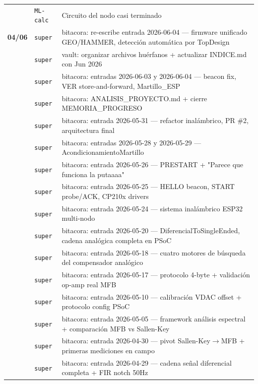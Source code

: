 \begin{longtable}{@{}p{1.7cm} p{1.5cm} p{12.2cm}@{}}
 & \texttt{\scriptsize ML-calc} & Circuito del nodo casi terminado \\
\textbf{04/06} & \texttt{\scriptsize super} & bitacora: re-escribe entrada 2026-06-04 --- firmware unificado GEO/HAMMER, detección automática por TopDesign \\
 & \texttt{\scriptsize super} & vault: organizar archivos huérfanos + actualizar INDICE.md con Jun 2026 \\
 & \texttt{\scriptsize super} & bitacora: entradas 2026-06-03 y 2026-06-04 --- beacon fix, VER store-and-forward, Martillo\_ESP \\
 & \texttt{\scriptsize super} & bitacora: ANALISIS\_PROYECTO.md + cierre MEMORIA\_PROGRESO \\
 & \texttt{\scriptsize super} & bitacora: entrada 2026-05-31 --- refactor inalámbrico, PR \#2, arquitectura final \\
 & \texttt{\scriptsize super} & bitacora: entradas 2026-05-28 y 2026-05-29 --- AcondicionamientoMartillo \\
 & \texttt{\scriptsize super} & bitacora: entrada 2026-05-26 --- PRESTART + "Parece que funciona la putaaaa" \\
 & \texttt{\scriptsize super} & bitacora: entrada 2026-05-25 --- HELLO beacon, START probe/ACK, CP210x drivers \\
 & \texttt{\scriptsize super} & bitacora: entrada 2026-05-24 --- sistema inalámbrico ESP32 multi-nodo \\
 & \texttt{\scriptsize super} & bitacora: entrada 2026-05-20 --- DiferencialToSingleEnded, cadena analógica completa en PSoC \\
 & \texttt{\scriptsize super} & bitacora: entrada 2026-05-18 --- cuatro motores de búsqueda del compensador analógico \\
 & \texttt{\scriptsize super} & bitacora: entrada 2026-05-17 --- protocolo 4-byte + validación op-amp real MFB \\
 & \texttt{\scriptsize super} & bitacora: entrada 2026-05-10 --- calibración VDAC offset + protocolo config PSoC \\
 & \texttt{\scriptsize super} & bitacora: entrada 2026-05-05 --- framework análisis espectral + comparación MFB vs Sallen-Key \\
 & \texttt{\scriptsize super} & bitacora: entrada 2026-04-30 --- pivot Sallen-Key$\rightarrow$MFB + primeras mediciones en campo \\
 & \texttt{\scriptsize super} & bitacora: entrada 2026-04-29 --- cadena señal diferencial completa + FIR notch 50Hz \\

\end{longtable}
